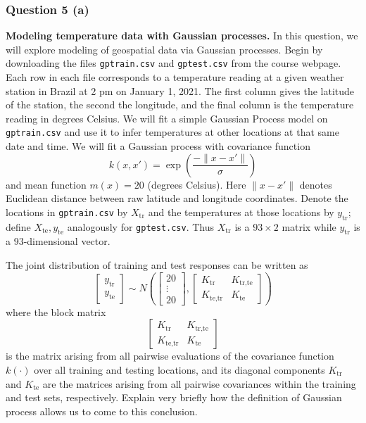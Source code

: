 \documentclass{article}
\begin{document}
\subsubsection*{Question 5 (a)}
\begin{flushleft}
    \textbf{Modeling temperature data with Gaussian processes.} In this question, we will explore modeling of geospatial data via Gaussian processes. 
    Begin by downloading the files \texttt{gptrain.csv} and \texttt{gptest.csv} from the course webpage. 
    Each row in each file corresponds to a temperature reading at a given weather station in Brazil at 2 pm on January 1, 2021. The first column gives the latitude of the station, the second the longitude, and the final column is the temperature reading in degrees Celsius. 
    We will fit a simple Gaussian Process model on \texttt{gptrain.csv} and use it to infer temperatures at other locations at that same date and time. 
    We will fit a Gaussian process with covariance function 
    \[
    k(x, x') = \exp\left(\frac{-\|x-x'\|}{\sigma}\right)
    \]
    and mean function $m(x) = 20$ (degrees Celsius). 
    Here $\|x-x'\|$ denotes Euclidean distance between raw latitude and longitude coordinates. 
    Denote the locations in \texttt{gptrain.csv} by $X_{\text{tr}}$ and the temperatures at those locations by $y_{\text{tr}}$; 
    define $X_{\text{te}}, y_{\text{te}}$ analogously for \texttt{gptest.csv}. Thus $X_{\text{tr}}$ is a $93 \times 2$ matrix while $y_{\text{tr}}$ is a 93-dimensional vector. 
    
    The joint distribution of training and test responses can be written as 
    \[
    \begin{bmatrix} y_{\text{tr}} \\ y_{\text{te}} \end{bmatrix} \sim N\left(\begin{bmatrix} 20 \\ \vdots \\ 20 \end{bmatrix}, \begin{bmatrix} K_{\text{tr}} & K_{\text{tr,te}} \\ K_{\text{te,tr}} & K_{\text{te}} \end{bmatrix}\right)
    \]
    where the block matrix 
    \[
    \begin{bmatrix} K_{\text{tr}} & K_{\text{tr,te}} \\ K_{\text{te,tr}} & K_{\text{te}} \end{bmatrix}
    \]
    is the matrix arising from all pairwise evaluations of the covariance function $k(\cdot)$ over all training and testing locations, and its diagonal components $K_{\text{tr}}$ 
    and $K_{\text{te}}$ are the matrices arising from all pairwise covariances within the training and test sets, respectively. 
    Explain very briefly how the definition of Gaussian process allows us to come to this conclusion. 
\end{flushleft}
\end{document}
